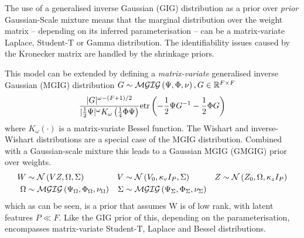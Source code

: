 The use of a generalised inverse Gaussian (GIG) distribution as a prior over \emph{prior} Gaussian-Scale mixture means that the marginal distribution over the weight matrix -- depending on its inferred parameterisation -- can be a matrix-variate Laplace, Student-T or Gamma distribution. The identifiability issues caused by the Kronecker matrix are handled by the shrinkage priors.

This model can be extended\cite{Yang2011} by defining a \emph{matrix-variate} generalised inverse Gaussian (MGIG) distribution $G\sim \mathcal{MGIG}\left(\Psi, \Phi, \nu\right), G \in { \mathbb{R}^{F \times F} }$
\begin{align}
\frac{|G|^{\omega - (F + 1)/2}}{|\frac{1}{2} \Psi|^\omega K_\omega \left(\frac{1}{4}\Phi \Psi\right)} \text{etr}\left( -\frac{1}{2} \Psi {G}^{-1} - \frac{1}{2} \Phi G \right)
\end{align}
where $K_\omega(\cdot)$ is a matrix-variate Bessel function. The Wishart and inverse-Wishart distributions are a special case of the MGIG distribution. Combined with a Gaussian-scale mixture this leads to a Gaussian MGIG (GMGIG) prior over weights.
\begin{align}
W & \sim \mathcal{N} \left(VZ, \Omega, \Sigma\right) &
V & \sim \mathcal{N} \left(V_0, \kappa_v I_P, \Sigma\right) &
Z & \sim \mathcal{N} \left(Z_0, \Omega, \kappa_z I_P\right) \\
\Omega & \sim \mathcal{MGIG}\left( \Psi_\Omega, \Phi_\Omega, \nu_\Omega \right) &
\Sigma & \sim \mathcal{MGIG}\left( \Psi_\Sigma, \Phi_\Sigma, \nu_\Sigma \right) &
\end{align}
which as can be seen, is a prior that assumes W is of low rank, with latent features $P \ll F$. Like the GIG prior of this, depending on the parameterisation, encompasses matrix-variate Student-T, Laplace and Bessel distributions. 






